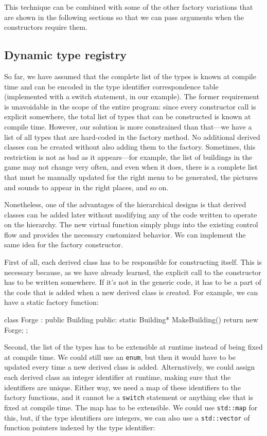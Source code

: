 This technique can be combined with some of the other factory variations that are shown in the following sections so that we can pass arguments when the constructors require them.

\subsection{Dynamic type registry}

So far, we have assumed that the complete list of the types is known at compile time and can be encoded in the type identifier correspondence table (implemented with a switch statement, in our example). The former requirement is unavoidable in the scope of the entire program: since every constructor call is explicit somewhere, the total list of types that can be constructed is known at compile time. However, our solution is more constrained than that---we have a list of all types that are hard-coded in the factory method. No additional derived classes can be created without also adding them to the factory. Sometimes, this restriction is not as bad as it appears---for example, the list of buildings in the game may not change very often, and even when it does, there is a complete list that must be manually updated for the right menu to be generated, the pictures and sounds to appear in the right places, and so on.

Nonetheless, one of the advantages of the hierarchical designs is that derived classes can be added later without modifying any of the code written to operate on the hierarchy. The new virtual function simply plugs into the existing control flow and provides the necessary customized behavior. We can implement the same idea for the factory constructor.

First of all, each derived class has to be responsible for constructing itself. This is necessary because, as we have already learned, the explicit call to the constructor has to be written somewhere. If it's not in the generic code, it has to be a part of the code that is added when a new derived class is created. For example, we can have a static factory function:

\begin{code}
class Forge : public Building {
  public:
  static Building* MakeBuilding() { return new Forge; }
};
\end{code}

Second, the list of the types has to be extensible at runtime instead of being fixed at compile time. We could still use an \texttt{enum}, but then it would have to be updated every time a new derived class is added. Alternatively, we could assign each derived class an integer identifier at runtime, making sure that the identifiers are unique. Either way, we need a map of these identifiers to the factory functions, and it cannot be a \texttt{switch} statement or anything else that is fixed at compile time. The map has to be extensible. We could use \texttt{std::map} for this, but, if the type identifiers are integers, we can also use a \texttt{std::vector} of function pointers indexed by the type identifier:

